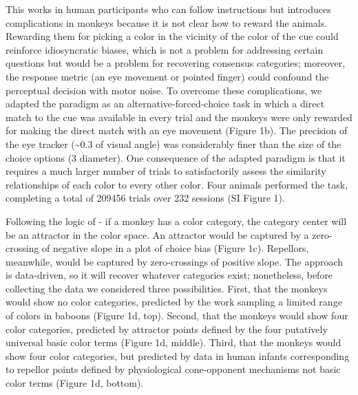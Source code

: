 \documentclass[9pt,biorxiv,lineno,onehalfspacing]{lapreprint}
\begin{document}
\begin{refsection}
This works in human participants who can follow instructions but introduces complications in monkeys because it is not clear how to reward the animals. 
Rewarding them for picking a color in the vicinity of the color of the cue could reinforce idiosyncratic biases, which is not a problem for addressing certain questions \citep{panichello_error-correcting_2019} but would be a problem for recovering consensus categories; moreover, the response metric (an eye movement or pointed finger) could confound the perceptual decision with motor noise. 
To overcome these complications, we adapted the paradigm as an alternative-forced-choice task in which a direct match to the cue was available in every trial and the monkeys were only rewarded for making the direct match with an eye movement (Figure 1b). 
The precision of the eye tracker (\textasciitilde0.3\degree{} of visual angle) was considerably finer than the size of the choice options (3\degree{} diameter). 
One consequence of the adapted paradigm is that it requires a much larger number of trials to satisfactorily assess the similarity relationships of each color to every other color. 
Four animals performed the task, completing a total of 209456 trials over 232 sessions (SI Figure 1).

Following the logic of \citet{bae_why_2015} - if a monkey has a color category, the category center will be an attractor in the color space. 
An attractor would be captured by a zero-crossing of negative slope in a plot of choice bias (Figure 1c). 
Repellors, meanwhile, would be captured by zero-crossings of positive slope. 
The approach is data-driven, so it will recover whatever categories exist; nonetheless, before collecting the data we considered three possibilities. 
First, that the monkeys would show no color categories, predicted by the work sampling a limited range of colors in baboons \citep{davidoff_cross-species_2010} (Figure 1d, top). 
Second, that the monkeys would show four color categories, predicted by attractor points defined by the four putatively universal basic color terms (Figure 1d, middle). 
Third, that the monkeys would show four color categories, but predicted by data in human infants corresponding to repellor points defined by physiological cone-opponent mechanisms not basic color terms \citep{skelton_biological_2017} (Figure 1d, bottom).


\end{refsection}
\end{document}
